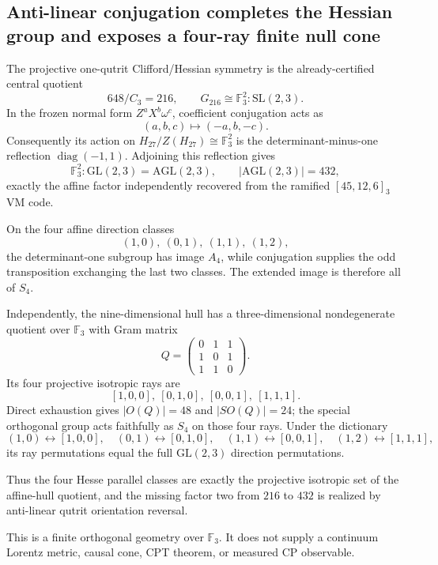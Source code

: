 \subsection*{Anti-linear conjugation completes the Hessian group and exposes a four-ray finite null cone}

The projective one-qutrit Clifford/Hessian symmetry is the already-certified
central quotient
\[
 648/C_3=216,\qquad G_{216}\cong
 \mathbb F_3^2:\mathrm{SL}(2,3).
\]
In the frozen normal form $Z^aX^b\omega^c$, coefficient conjugation acts as
\[
 (a,b,c)\longmapsto(-a,b,-c).
\]
Consequently its action on $H_{27}/Z(H_{27})\cong\mathbb F_3^2$ is the
determinant-minus-one reflection $\operatorname{diag}(-1,1)$.  Adjoining this
reflection gives
\[
 \mathbb F_3^2:\mathrm{GL}(2,3)=\mathrm{AGL}(2,3),\qquad |\mathrm{AGL}(2,3)|=432,
\]
exactly the affine factor independently recovered from the ramified
$[45,12,6]_3$ VM code.

On the four affine direction classes
\[
 (1,0),\ (0,1),\ (1,1),\ (1,2),
\]
the determinant-one subgroup has image $A_4$, while conjugation supplies the
odd transposition exchanging the last two classes.  The extended image is
therefore all of $S_4$.

Independently, the nine-dimensional hull has a three-dimensional nondegenerate
quotient over $\mathbb F_3$ with Gram matrix
\[
 Q=\begin{pmatrix}0&1&1\\1&0&1\\1&1&0\end{pmatrix}.
\]
Its four projective isotropic rays are
\[
 [1,0,0],\ [0,1,0],\ [0,0,1],\ [1,1,1].
\]
Direct exhaustion gives $|O(Q)|=48$ and $|SO(Q)|=24$; the special orthogonal
group acts faithfully as $S_4$ on those four rays.  Under the dictionary
\[
 (1,0)\leftrightarrow[1,0,0],\quad
 (0,1)\leftrightarrow[0,1,0],\quad
 (1,1)\leftrightarrow[0,0,1],\quad
 (1,2)\leftrightarrow[1,1,1],
\]
its ray permutations equal the full $\mathrm{GL}(2,3)$ direction permutations.

Thus the four Hesse parallel classes are exactly the projective isotropic set
of the affine-hull quotient, and the missing factor two from $216$ to $432$ is
realized by anti-linear qutrit orientation reversal.

This is a finite orthogonal geometry over $\mathbb F_3$.  It does not supply a
continuum Lorentz metric, causal cone, CPT theorem, or measured CP observable.
